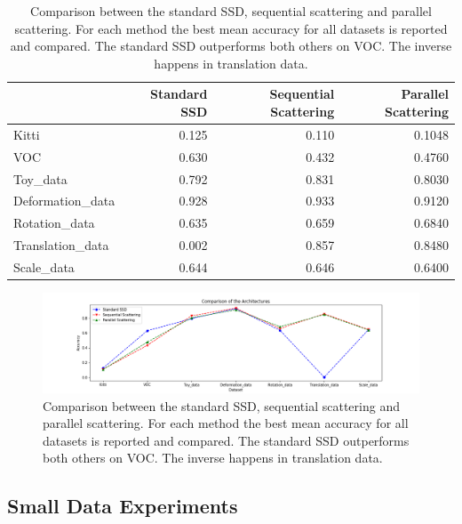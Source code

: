 \begin{table}[!htb]
	\centering
	\caption{Comparison between the standard SSD, sequential scattering and parallel scattering. For each method the best mean accuracy for all datasets is reported and compared. The standard SSD outperforms both others on VOC. The inverse happens in translation data.}
	\begin{tabular}{lrrr}
		\toprule
		{} &  Standard SSD &  Sequential Scattering &  Parallel Scattering \\
		\midrule
		Kitti            &         0.125 &                  0.110 &               0.1048 \\
		VOC              &         0.630 &                  0.432 &               0.4760 \\
		Toy\_data         &         0.792 &                  0.831 &               0.8030 \\
		Deformation\_data &         0.928 &                  0.933 &               0.9120 \\
		Rotation\_data    &         0.635 &                  0.659 &               0.6840 \\
		Translation\_data &         0.002 &                  0.857 &               0.8480 \\
		Scale\_data       &         0.644 &                  0.646 &               0.6400 \\
		\bottomrule
	\end{tabular}
	\label{table:comparison}
\end{table}

\begin{figure}[!htb]
	\centering
	\includegraphics[width=\textwidth]{images/comparison.png}
	\caption{Comparison between the standard SSD, sequential scattering and parallel scattering. For each method the best mean accuracy for all datasets is reported and compared. The standard SSD outperforms both others on VOC. The inverse happens in translation data.}
	\label{fig:comparison}
\end{figure}

\subsection{Small Data Experiments}
\label{subsec:small_data_results}

